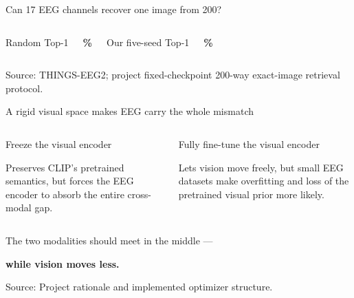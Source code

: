 \documentclass[aspectratio=169]{beamer}
\newcommand{\sourcefooter}[1]{%
  \vfill
  {\color{MidGray}\fontsize{6.7}{8.0}\selectfont Source: #1\par}
}
\begin{document}
\begin{frame}{Can 17 EEG channels recover one image from 200?}
\begin{columns}[T,onlytextwidth]
      \vspace{5pt}
      \begin{columns}[T,onlytextwidth]
          \centering
          {\color{MidGray}\fontsize{10}{12}\selectfont Random Top-1\par}
          {\color{AccentOrange}\bfseries\fontsize{22}{25}\%\par}
          \centering
          {\color{MidGray}\fontsize{10}{12}\selectfont Our five-seed Top-1\par}
          {\color{BrainBlue}\bfseries\fontsize{22}{25}\%\par}
      \end{columns}
  \end{columns}
  \sourcefooter{THINGS-EEG2; project fixed-checkpoint 200-way exact-image retrieval protocol.}
\end{frame}

\begin{frame}{A rigid visual space makes EEG carry the whole mismatch}
  \vspace{4pt}
  \begin{columns}[T,onlytextwidth]
      \begin{block}{Freeze the visual encoder}
        \vspace{2pt}
        {\fontsize{13.5}{17}\selectfont
          Preserves CLIP's pretrained semantics, but forces the EEG encoder
          to absorb the entire cross-modal gap.
        \par}
      \end{block}

      \begin{alertblock}{Fully fine-tune the visual encoder}
        \vspace{2pt}
        {\fontsize{13.5}{17}\selectfont
          Lets vision move freely, but small EEG datasets make overfitting
          and loss of the pretrained visual prior more likely.
        \par}
      \end{alertblock}
  \end{columns}

  \vspace{13pt}
  \begin{center}
    {\color{MidGray}\fontsize{13}{16}\selectfont
      The two modalities should meet in the middle ---
    \par}
    \vspace{3pt}
    {\color{HAIred}\bfseries\fontsize{21}{25}\selectfont
      while vision moves less.
    \par}
  \end{center}
  \sourcefooter{Project rationale and implemented optimizer structure.}
\end{frame}
\end{document}
